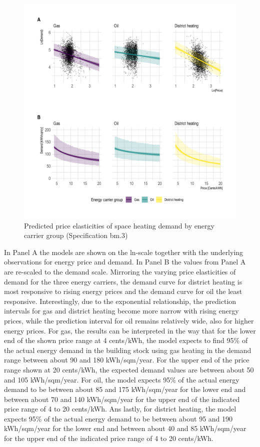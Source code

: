\documentclass[12pt,twoside]{reedthesis}
\begin{document}
\begin{figure}

{\centering \includegraphics[width=1.04\linewidth]{figure/elasticity_predictions_subsample} 

}

\caption{Predicted price elasticities of space heating demand by energy carrier group (Specification bm.3)}\label{fig:elasticity-predictions-energy-carrier}
\end{figure}
In Panel A the models are shown on the ln-scale together with the underlying observations for energy price and demand. In Panel B the values from Panel A are re-scaled to the demand scale. Mirroring the varying price elasticities of demand for the three energy carriers, the demand curve for district heating is most responsive to rising energy prices and the demand curve for oil the least responsive. Interestingly, due to the exponential relationship, the prediction intervals for gas and district heating become more narrow with rising energy prices, while the prediction interval for oil remains relatively wide, also for higher energy prices. For gas, the results can be interpreted in the way that for the lower end of the shown price range at 4 cents/kWh, the model expects to find 95\% of the actual energy demand in the building stock using gas heating in the demand range between about 90 and 180 kWh/sqm/year. For the upper end of the price range shown at 20 cents/kWh, the expected demand values are between about 50 and 105 kWh/sqm/year. For oil, the model expects 95\% of the actual energy demand to be between about 85 and 175 kWh/sqm/year for the lower end and between about 70 and 140 kWh/sqm/year for the upper end of the indicated price range of 4 to 20 cents/kWh. Ans lastly, for district heating, the model expects 95\% of the actual energy demand to be between about 95 and 190 kWh/sqm/year for the lower end and between about 40 and 85 kWh/sqm/year for the upper end of the indicated price range of 4 to 20 cents/kWh.
\end{document}
